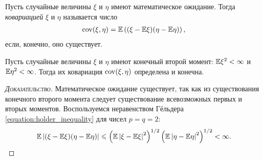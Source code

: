 \documentclass[../main.tex]{subfiles}
\begin{document}
      \begin{df}[ковариация]
       Пусть случайные величины $ \xi $ и $ \eta $ имеют математическое ожидание. Тогда \textit{ковариацией} $ \xi $ и $ \eta $ называется число
       \begin{align*}
        \mathrm{cov}(\xi,\eta) = \mathbb E \left( (\xi - \mathbb E\xi)(\eta - \mathbb E\eta) \right),
       \end{align*} если, конечно, оно существует.
      \end{df}

      \begin{prop}
       Пусть случайные величины $ \xi $ и $ \eta $ имеют конечный второй момент: $ \mathbb E\xi^{2} < \infty $ и $ \mathbb E\eta^{2} < \infty $. Тогда их ковариация $ \mathrm{cov}(\xi,\eta) $ определена и конечна.
      \end{prop}
      \begin{proof}[\normalfont\textsc{Доказательство}]
       Математическое ожидание существует, так как из существования конечного второго момента следует существование всевозможных первых и вторых моментов. Воспользуемся неравенством Гёльдера \eqref{equation:holder_inequality} для чисел $ p = q = 2 $:
       \begin{align*}
        \mathbb E \left| (\xi - \mathbb E\xi)(\eta-\mathbb E\eta) \right| \leqslant \left( \mathbb E \left| \xi-\mathbb E\xi \right|^{2} \right)^{1 / 2} \left( \mathbb E \left| \eta-\mathbb E\eta \right|^{2} \right)^{1 / 2} < \infty.
       \end{align*}
      \end{proof}
\end{document}
